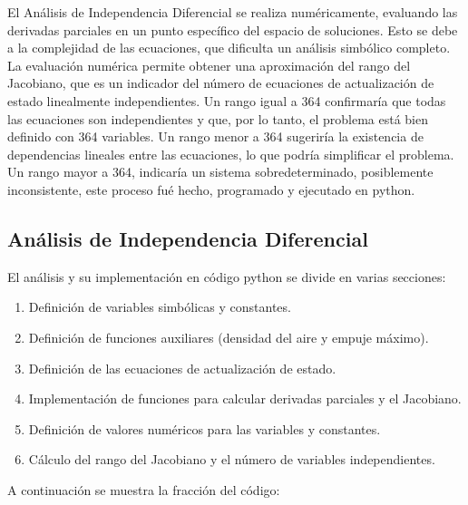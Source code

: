 \documentclass[fleqn]{article}
\begin{document}
El Análisis de Independencia Diferencial se realiza numéricamente, evaluando las derivadas parciales en un punto específico del espacio de soluciones. Esto se debe a la complejidad de las ecuaciones, que dificulta un análisis simbólico completo. La evaluación numérica permite obtener una aproximación del rango del Jacobiano, que es un indicador del número de ecuaciones de actualización de estado linealmente independientes. Un rango igual a 364 confirmaría que todas las ecuaciones son independientes y que, por lo tanto, el problema está bien definido con 364 variables. Un rango menor a 364 sugeriría la existencia de dependencias lineales entre las ecuaciones, lo que podría simplificar el problema. Un rango mayor a 364, indicaría un sistema sobredeterminado, posiblemente inconsistente, este proceso fué hecho, programado y ejecutado en python.

\subsection{Análisis de Independencia Diferencial}

El análisis y su implementación en código python se divide en varias secciones:

\begin{enumerate}
    \item Definición de variables simbólicas y constantes.
    \item Definición de funciones auxiliares (densidad del aire y empuje máximo).
    \item Definición de las ecuaciones de actualización de estado.
    \item Implementación de funciones para calcular derivadas parciales y el Jacobiano.
    \item Definición de valores numéricos para las variables y constantes.
    \item Cálculo del rango del Jacobiano y el número de variables independientes.
\end{enumerate}

A continuación se muestra la fracción del código:
\end{document}
